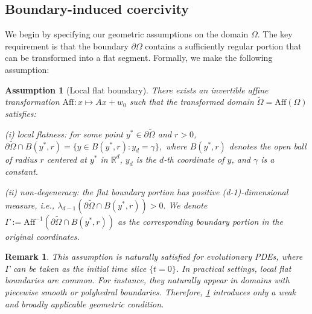 \documentclass{article}
\newtheorem{remark}{Remark}
\newtheorem{assumption}{Assumption}
\begin{document}
\subsection{Boundary-induced coercivity}\label{sec:boundary coercivity}
We begin by specifying our geometric assumptions on the domain $\Omega$. 
The key requirement is that the boundary $\partial \Omega$ contains a sufficiently regular portion that can be transformed into a flat segment. 
Formally, we make the following assumption:
\begin{assumption}[Local flat boundary]\label{assumption:flat}
    There exists an invertible affine transformation $\mathrm{Aff}: x \mapsto Ax + w_0$  such that the transformed domain $\tilde{\Omega}= \mathrm{Aff}(\Omega)$ satisfies:

    (i) local flatness: for some point \(y^* \in \partial\tilde\Omega\) and  \(r > 0\),
    $
        \partial \tilde\Omega \cap B(y^*, r) = \{y \in B(y^*, r) : y_d = \gamma\},
    $
    where \(B(y^*, r)\) denotes the open ball of radius \(r\) centered at \(y^*\) in \(\mathbb{R}^d\), $y_d$ is the \(d\)-th coordinate of \(y\), and \(\gamma\) is a constant.
    
    (ii) non-degeneracy: the flat boundary portion has positive (d-1)-dimensional measure, i.e.,
    $
    \lambda_{d-1}(\partial\tilde\Omega \cap B(y^*, r)) > 0.
    $
We denote \(\Gamma := \mathrm{Aff}^{-1}(\partial\tilde\Omega \cap B(y^*, r))\) as the corresponding boundary portion in the original coordinates.
\end{assumption}

\begin{remark}
    This assumption is naturally satisfied for evolutionary PDEs, where $\Gamma$ can be taken as the initial time slice $\{t = 0\}$. 
    In practical settings, local flat boundaries are common. For instance, they naturally appear in domains with piecewise smooth or polyhedral boundaries.
    Therefore, \cref{assumption:flat} introduces only a weak and broadly applicable geometric condition.
\end{remark}
\end{document}
